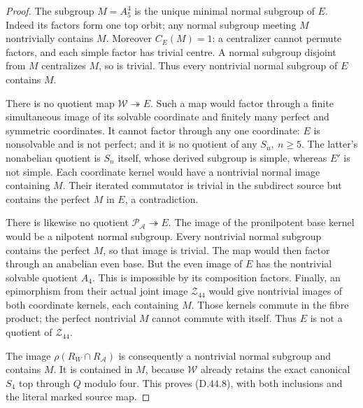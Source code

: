 \begin{proof}
The subgroup \(M=A_5^4\) is the unique
minimal normal subgroup of \(E\).
Indeed its factors form one top orbit;
any normal subgroup meeting \(M\)
nontrivially contains \(M\).
Moreover \(C_E(M)=1\): a centralizer
cannot permute factors, and each
simple factor has trivial centre.
A normal subgroup disjoint from
\(M\) centralizes \(M\), so is
trivial. Thus every nontrivial
normal subgroup of \(E\) contains \(M\).

There is no quotient map
\(\mathcal W\twoheadrightarrow E\).
Such a map would factor through
a finite simultaneous image of
its solvable coordinate and
finitely many perfect and symmetric
coordinates. It cannot factor
through any one coordinate:
\(E\) is nonsolvable and is not
perfect; and it is no quotient
of any \(S_n,\ n\ge5\).
The latter's nonabelian quotient
is \(S_n\) itself, whose derived
subgroup is simple, whereas
\(E'\) is not simple.
Each coordinate kernel would
have a nontrivial normal image
containing \(M\). Their iterated
commutator is trivial in the
subdirect source but contains
the perfect \(M\) in \(E\),
a contradiction.

There is likewise no quotient
\(\mathcal P_{\mathscr A}\twoheadrightarrow E\).
The image of the pronilpotent base
kernel would be a nilpotent
normal subgroup. Every nontrivial
normal subgroup contains the
perfect \(M\), so that image
is trivial. The map would then
factor through an anabelian
even base. But the even image
of \(E\) has the nontrivial
solvable quotient \(A_4\).
This is impossible by its
composition factors.
Finally, an epimorphism from
their actual joint image
\(\mathcal Z_{44}\) would give
nontrivial images of both
coordinate kernels, each
containing \(M\). Those kernels
commute in the fibre product;
the perfect nontrivial \(M\)
cannot commute with itself.
Thus \(E\) is not a quotient
of \(\mathcal Z_{44}\).

The image \(\rho(R_W\cap
R_{\mathscr A})\) is consequently
a nontrivial normal subgroup
and contains \(M\). It is
contained in \(M\), because
\(\mathcal W\) already retains
the exact canonical \(S_4\)
top through \(Q\) modulo four.
This proves (D.44.8), with
both inclusions and the literal
marked source map.
\end{proof}
